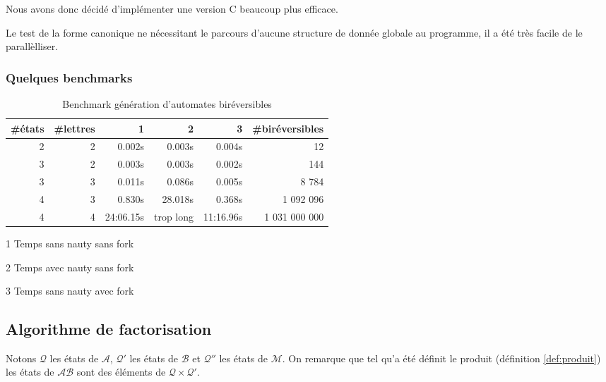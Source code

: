 \documentclass[11pt,a4paper]{article}
\begin{document}
Nous avons donc décidé d'implémenter une version C beaucoup plus efficace.

Le test de la forme canonique ne nécessitant le parcours d'aucune structure de donnée globale au programme, il a été très facile de le parallèlliser.

\subsubsection*{Quelques benchmarks}

\begin{center}
  \begin{table}[h!]
    \begin{threeparttable}
    \begin{tabular}{|rrrrrr|}
      \hline
      \#états & \#lettres & 1 & 2 & 3 & \#biréversibles \\ [0.5ex]
      \hline\hline
      2 & 2 & 0.002s & 0.003s & 0.004s & 12 \\
      \hline
      3 & 2 & 0.003s & 0.003s & 0.002s & 144 \\
      \hline
      3 & 3 & 0.011s & 0.086s & 0.005s & 8 784 \\
      \hline
      4 & 3 & 0.830s & 28.018s & 0.368s & 1 092 096 \\
      \hline
      4 & 4 & 24:06.15s & trop long & 11:16.96s & 1 031 000 000 \\
      \hline
    \end{tabular}

    \caption{Benchmark génération d'automates biréversibles}
    \begin{tablenotes}
    \item[1] Temps sans nauty sans fork
    \item[2] Temps avec nauty sans fork
    \item[3] Temps sans nauty avec fork
    \end{tablenotes}
\end{threeparttable}
  \end{table}
\end{center}

\subsection{Algorithme de factorisation}

  Notons $\mathcal{Q}$ les états de $\mathcal{A}$, $\mathcal{Q'}$ les états de $\mathcal{B}$ et $\mathcal{Q''}$ les états de $\mathcal{M}$. On remarque que tel qu'a été définit le produit (définition \ref{def:produit}) les états de $\mathcal{AB}$ sont des éléments de $\mathcal{Q}\times\mathcal{Q'}$.
\end{document}

